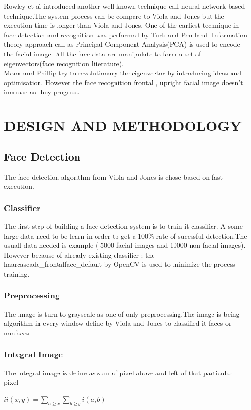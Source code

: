\documentclass[a4paper,11pt]{article}
\begin{document}
\hspace{1cm}Rowley et a\.l introduced another well known technique call neural network-based technique.The system process can be compare to Viola and Jones but the execution time is longer than Viola and Jones. One of the earliest technique in face detection and recognition was performed by Turk and Pentland. Information theory approach call as Principal Component Analysis(PCA) is used to encode the facial image. All the face data are manipulate to form a set of eigenvectors(face recognition literature).\\

\hspace{1cm}Moon and Phillip try to revolutionary the eigenvector by introducing ideas and optimisation. However the face recognition frontal , upright facial image doesn't increase as they progress.




\section{DESIGN AND METHODOLOGY}

\subsection{Face Detection}
\hspace{1cm}The face detection algorithm from Viola and Jones is chose based on fast execution.
\subsubsection{Classifier}
\hspace{1cm}The first step of building a face detection system is to train it classifier. A some large data need to be learn in order to get a 100\% rate of sucessful detection.The usuall data needed is example ( 5000 facial images and 10000 non-facial images). However because of already existing classifier : the haarcascade\_frontalface\_default by OpenCV is used to minimize the process training.
\subsubsection{Preprocessing}
\hspace{1cm} The image is turn to grayscale as one of only preprocessing.The image is being algorithm in every window define by Viola and Jones to classified it faces or non\-faces.
\subsubsection{Integral Image}
\hspace{1cm} The integral image is define as sum of pixel above and left of that particular pixel.\\\\
$ii(x,y) = \sum_{a\geq x} \sum_{b\geq y} i(a,b) $ \\\\
\end{document}
